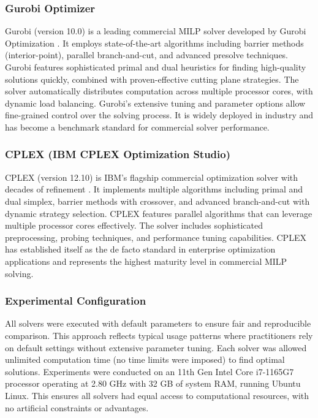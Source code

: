 \documentclass[11pt,a4paper]{article}
\begin{document}
\subsubsection{Gurobi Optimizer}
Gurobi (version 10.0) is a leading commercial MILP solver developed by Gurobi Optimization \cite{gurobi2024}. It employs state-of-the-art algorithms including barrier methods (interior-point), parallel branch-and-cut, and advanced presolve techniques. Gurobi features sophisticated primal and dual heuristics for finding high-quality solutions quickly, combined with proven-effective cutting plane strategies. The solver automatically distributes computation across multiple processor cores, with dynamic load balancing. Gurobi's extensive tuning and parameter options allow fine-grained control over the solving process. It is widely deployed in industry and has become a benchmark standard for commercial solver performance.

\subsubsection{CPLEX (IBM CPLEX Optimization Studio)}
CPLEX (version 12.10) is IBM's flagship commercial optimization solver with decades of refinement \cite{cplex2024}. It implements multiple algorithms including primal and dual simplex, barrier methods with crossover, and advanced branch-and-cut with dynamic strategy selection. CPLEX features parallel algorithms that can leverage multiple processor cores effectively. The solver includes sophisticated preprocessing, probing techniques, and performance tuning capabilities. CPLEX has established itself as the de facto standard in enterprise optimization applications and represents the highest maturity level in commercial MILP solving.

\subsubsection{Experimental Configuration}
All solvers were executed with default parameters to ensure fair and reproducible comparison. This approach reflects typical usage patterns where practitioners rely on default settings without extensive parameter tuning. Each solver was allowed unlimited computation time (no time limits were imposed) to find optimal solutions. Experiments were conducted on an 11th Gen Intel Core i7-1165G7 processor operating at 2.80 GHz with 32 GB of system RAM, running Ubuntu Linux. This ensures all solvers had equal access to computational resources, with no artificial constraints or advantages.
\end{document}
